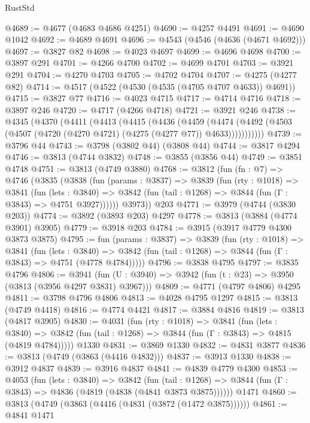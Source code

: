\begin{lexlean}{RustStd}
\begin{coremodule}
{\begin{coremodule}
{{{{{{{{{{{{{{{{{{{{{{{{{{{{{{{{{{{@4689 := @4677 (@4683 @4686 @4251)
@4690 := @4257 @4491
@4691 := @4690 @1042
@4692 := @4689 @4691
@4696 := @4543 (@4546 (@4636 (@4671 @4692)))
@4697 := @3827 @82
@4698 := @4023 @4697
@4699 := @4696 @4698
@4700 := @3897 @291
@4701 := @4266 @4700
@4702 := @4699 @4701
@4703 := @3921 @291
@4704 := @4270 @4703
@4705 := @4702 @4704
@4707 := @4275 (@4277 @82)
@4714 := @4517 (@4522 (@4530 (@4535 (@4705 @4707 @4633)) @4691))
@4715 := @3827 @77
@4716 := @4023 @4715
@4717 := @4714 @4716
@4718 := @3897 @246
@4720 := @4717 (@4266 @4718)
@4721 := @3921 @246
@4738 := @4345
    (@4370
      (@4411
        (@4413
          (@4415
            (@4436
              (@4459
                (@4474
                  (@4492 (@4503 (@4507 (@4720 (@4270 @4721) (@4275 (@4277 @77)) @4633)))))))))))
@4739 := @3796 @44
@4743 := @3798 (@3802 @44) (@3808 @44)
@4744 := @3817 @4294
@4746 := @3813 (@4744 @3832)
@4748 := @3855 (@3856 @44)
@4749 := @3851 @4748
@4751 := @3813 (@4749 @3880)
@4768 := @3812
    (fun (fn : @7) =>
    @4746
      (@3835
        (@3838
          (fun (params : @3837) =>
          @3839
            (fun (rty : @1018) =>
            @3841
              (fun (lets : @3840) =>
              @3842 (fun (tail : @1268) => @3844 (fun (Γ : @3843) => @4751 @3927))))))
        @3973))
    @203
@4771 := @3979 (@4744 (@3830 @203))
@4774 := @3892 (@3893 @203) @4297
@4778 := @3813 (@3884 (@4774 @3901) @3905)
@4779 := @3918 @203
@4784 := @3915 (@3917 @4779 @4300 @3873 @3875)
@4795 := fun (params : @3837) =>
  @3839
    (fun (rty : @1018) =>
    @3841
      (fun (lets : @3840) =>
      @3842 (fun (tail : @1268) => @3844 (fun (Γ : @3843) => @4751 (@4778 @4784)))))
@4796 := @3838 @4795
@4797 := @3835 @4796
@4806 := @3941 (fun (U : @3940) => @3942 (fun (t : @23) => @3950 (@3813 (@3956 @4297 @3831) @3967)))
@4809 := @4771 (@4797 @4806) @4295
@4811 := @3798 @4796 @4806
@4813 := @4028 @4795 @1297
@4815 := @3813 (@4749 @4418)
@4816 := @4774 @4421
@4817 := @3884 @4816
@4819 := @3813 (@4817 @3905)
@4830 := @4031
    (fun (rty : @1018) =>
    @3841
      (fun (lets : @3840) =>
      @3842 (fun (tail : @1268) => @3844 (fun (Γ : @3843) => @4815 (@4819 @4784)))))
    @1330
@4831 := @3869 @1330
@4832 := @4831 @3877
@4836 := @3813 (@4749 (@3863 (@4416 @4832)))
@4837 := @3913 @1330
@4838 := @3912 @4837
@4839 := @3916 @4837
@4841 := @4839 @4779 @4300
@4853 := @4053
    (fun (lets : @3840) =>
    @3842
      (fun (tail : @1268) => @3844 (fun (Γ : @3843) => @4836 (@4819 (@4838 (@4841 @3873 @3875))))))
    @1471
@4860 := @3813 (@4749 (@3863 (@4416 (@4831 (@3872 (@1472 @3875))))))
@4861 := @4841 @1471
}}}}}}}}}}}}}}}}}}}}}}}}}}}}}}}}}}}
\end{coremodule}}
\end{coremodule}
\end{lexlean}
